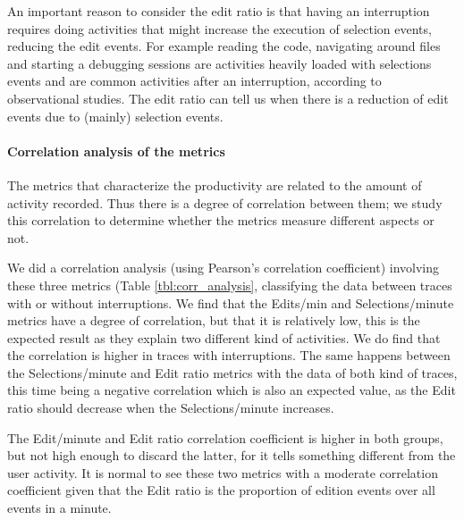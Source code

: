 \documentclass[times]{smrauth}
\newcommand\RR[1]{\textbf{Romain #1}}
\begin{document}

An important reason to consider the edit ratio is that having an interruption requires doing activities that might increase the execution of selection events, reducing the edit events. For example reading the code, navigating around files and starting a debugging sessions are activities heavily loaded with selections events and are common activities after an interruption, according to observational studies. The edit ratio can tell us when there is a reduction of edit events due to (mainly) selection events.

\paragraph{Correlation analysis of the metrics}
The metrics that characterize the productivity are related to the amount of activity recorded. Thus there is a degree of correlation between them; we study this correlation to determine whether the metrics measure different aspects or not.  %

We did a correlation analysis (using Pearson's correlation coefficient) involving these three metrics (Table \ref{tbl:corr_analysis}, classifying the data between traces with or without interruptions. We find that the Edits/min and Selections/minute metrics have a degree of correlation, but that it is relatively low, this is the expected result as they explain two different kind of activities. We do find that the correlation is higher in traces with interruptions. The same happens between the Selections/minute and Edit ratio metrics with the data of both kind of traces, this time being a negative correlation which is also an expected value, as the Edit ratio should decrease when the Selections/minute increases. 

The Edit/minute and Edit ratio correlation coefficient is higher in both groups, but not high enough to discard the latter, for it tells something different from the user activity. It is normal to see these two metrics with a moderate correlation coefficient given that the Edit ratio is the proportion of edition events over all events in a minute.
\end{document}
